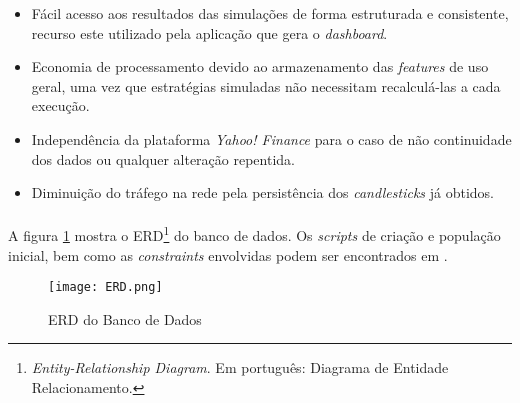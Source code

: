 \begin{itemize}
    \item Fácil acesso aos resultados das simulações de forma estruturada e consistente, recurso este utilizado pela aplicação que gera o \textit{dashboard}.
    \item Economia de processamento devido ao armazenamento das \textit{features} de uso geral, uma vez que estratégias simuladas não necessitam recalculá-las a cada execução.
    \item Independência da plataforma \textit{Yahoo! Finance} para o caso de não continuidade dos dados ou qualquer alteração repentida.
    \item Diminuição do tráfego na rede pela persistência dos \textit{candlesticks} já obtidos.
\end{itemize}


\paragraph{} A figura \ref{fig:103} mostra o ERD\footnote{\textit{Entity-Relationship Diagram}. Em português: Diagrama de Entidade Relacionamento.} do banco de dados. Os \textit{scripts} de criação e população inicial, bem como as \textit{constraints} envolvidas podem ser encontrados em \cite{github_db_schema}.

\begin{landscape}

\begin{figure}[!htb]
    \texttt{[image: ERD.png]}
    \centering
    \caption{ERD do Banco de Dados}
    \label{fig:103}
\end{figure}

\end{landscape}




